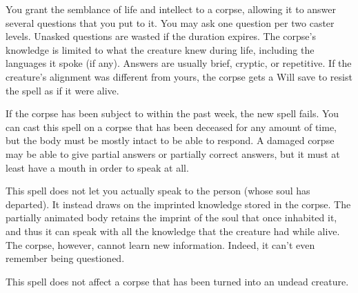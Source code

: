 \spellrng{\rngclose}
\begin{spelleffect}
You grant the semblance of life and intellect to a corpse, allowing it to answer several questions that you put to it. You may ask one question per two caster levels. Unasked questions are wasted if the duration expires. The corpse's knowledge is limited to what the creature knew during life, including the languages it spoke (if any). Answers are usually brief, cryptic, or repetitive. If the creature's alignment was different from yours, the corpse gets a Will save to resist the spell as if it were alive.
\par If the corpse has been subject to  within the past week, the new spell fails. You can cast this spell on a corpse that has been deceased for any amount of time, but the body must be mostly intact to be able to respond. A damaged corpse may be able to give partial answers or partially correct answers, but it must at least have a mouth in order to speak at all.
\par This spell does not let you actually speak to the person (whose soul has departed). It instead draws on the imprinted knowledge stored in the corpse. The partially animated body retains the imprint of the soul that once inhabited it, and thus it can speak with all the knowledge that the creature had while alive. The corpse, however, cannot learn new information. Indeed, it can't even remember being questioned.
\end{spelleffect}
\begin{spellnotes}
This spell does not affect a corpse that has been turned into an undead creature.
\end{spellnotes}

\begin{comment}
\spellsection{Spellstaff}
\spellschool{Transmutation (Imbuement) [Magic]}
\spelllvl{Divine 4}
\spellcmp{V, S, F}
\spelltime{10 minutes}
\spellrng{Touch}
\spelltgt{Wooden quarterstaff touched}
\spelldur{Permanent until discharged (D)}
\spellsave{Will negates (object)}
\spellsr{Yes (Will)}
\begin{spelleffect}
You store one spell that you know in a wooden quarterstaff. Only one such spell can be stored in a staff at a given time, and you cannot have more than one spellstaff at any given time. You can cast a spell stored within a staff as long as you are holding the staff, but it does not count against your normal allotment for a given day. You use up any applicable material components required to cast the spell when you store it in the spellstaff.
\end{spelleffect}
\spellfocus{The staff that stores the spell.}
\end{spellstaff}
\end{comment}

